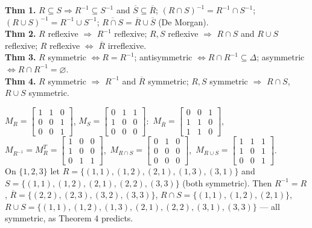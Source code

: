 \documentclass{fkt-notes}
\theoremstyle{definition}
\begin{document}
\begin{rulebox}[title={4.7 Theorems 1--4}]
  \textbf{Thm 1.} $R\subseteq S\Rightarrow R^{-1}\subseteq S^{-1}$ and
  $\overline S\subseteq\overline R$;
  $(R\cap S)^{-1}=R^{-1}\cap S^{-1}$; $(R\cup S)^{-1}=R^{-1}\cup S^{-1}$;
  $\overline{R\cap S}=\overline R\cup\overline S$ (De Morgan).\\
  \textbf{Thm 2.} $R$ reflexive $\Rightarrow$ $R^{-1}$ reflexive; $R,S$
  reflexive $\Rightarrow$ $R\cap S$ and $R\cup S$ reflexive;
  $R$ reflexive $\iff$ $\overline R$ irreflexive.\\
  \textbf{Thm 3.} $R$ symmetric $\iff R=R^{-1}$;
  antisymmetric $\iff R\cap R^{-1}\subseteq\Delta$;
  asymmetric $\iff R\cap R^{-1}=\varnothing$.\\
  \textbf{Thm 4.} $R$ symmetric $\Rightarrow$ $R^{-1}$ and $\overline R$
  symmetric; $R,S$ symmetric $\Rightarrow$ $R\cap S$, $R\cup S$ symmetric.
\end{rulebox}

\begin{example}
  $M_R=\begin{bmatrix}1&1&0\\0&0&1\\0&0&1\end{bmatrix}$,
  $M_S=\begin{bmatrix}0&1&1\\1&0&0\\0&0&0\end{bmatrix}$:\
  $M_{\overline R}=\begin{bmatrix}0&0&1\\1&1&0\\1&1&0\end{bmatrix}$,\
  $M_{R^{-1}}=M_R^T=\begin{bmatrix}1&0&0\\1&0&0\\0&1&1\end{bmatrix}$,\
  $M_{R\cap S}=\begin{bmatrix}0&1&0\\0&0&0\\0&0&0\end{bmatrix}$,\
  $M_{R\cup S}=\begin{bmatrix}1&1&1\\1&0&1\\0&0&1\end{bmatrix}$.\\[3pt]
  On $\{1,2,3\}$ let $R=\{(1,1),(1,2),(2,1),(1,3),(3,1)\}$ and
  $S=\{(1,1),(1,2),(2,1),(2,2),(3,3)\}$ (both symmetric). Then
  $R^{-1}=R$, $\overline R=\{(2,2),(2,3),(3,2),(3,3)\}$,
  $R\cap S=\{(1,1),(1,2),(2,1)\}$,
  $R\cup S=\{(1,1),(1,2),(1,3),(2,1),(2,2),(3,1),(3,3)\}$ --- all symmetric,
  as Theorem 4 predicts.
\end{example}
\end{document}
